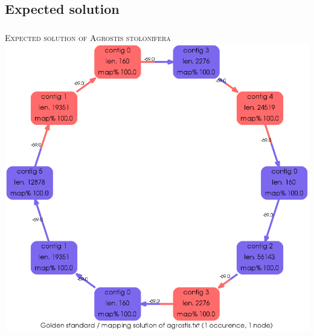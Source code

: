 \documentclass{beamer}
\begin{document}
\subsection{Expected solution}\label{7}
\begin{frame}
\frametitle{\textsc{}}
\textsc{Expected solution of Agrostis stolonifera} \\
\includegraphics[scale=0.2]{agrostis_GOLD.png}
\end{frame}
\end{document}
